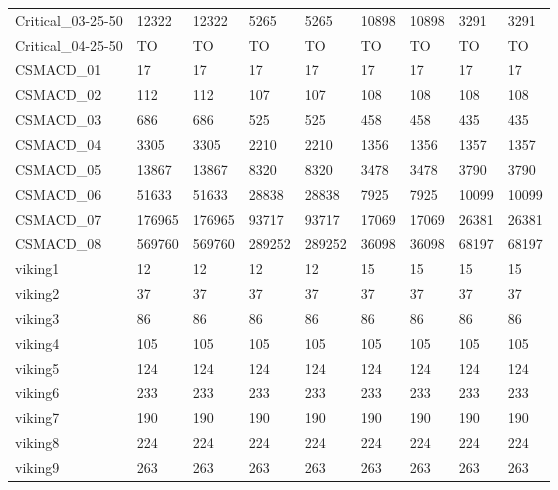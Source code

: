 \begin{table}
\begin{adjustbox}{max totalheight=\textheight}
\begin{tabular}{|l|llllllll|}
    Critical\_03-25-50 & 12322    & 12322    & 5265     & 5265     & 10898 & 10898 & 3291  & 3291  \\
    Critical\_04-25-50 & TO       & TO       & TO       & TO       & TO    & TO    & TO    & TO    \\ \hline
    CSMACD\_01         & 17       & 17       & 17       & 17       & 17    & 17    & 17    & 17    \\
    CSMACD\_02         & 112      & 112      & 107      & 107      & 108   & 108   & 108   & 108   \\
    CSMACD\_03         & 686      & 686      & 525      & 525      & 458   & 458   & 435   & 435   \\
    CSMACD\_04         & 3305     & 3305     & 2210     & 2210     & 1356  & 1356  & 1357  & 1357  \\
    CSMACD\_05         & 13867    & 13867    & 8320     & 8320     & 3478  & 3478  & 3790  & 3790  \\
    CSMACD\_06         & 51633    & 51633    & 28838    & 28838    & 7925  & 7925  & 10099 & 10099 \\
    CSMACD\_07         & 176965   & 176965   & 93717    & 93717    & 17069 & 17069 & 26381 & 26381 \\
    CSMACD\_08         & 569760   & 569760   & 289252   & 289252   & 36098 & 36098 & 68197 & 68197 \\ \hline
    viking1            & 12       & 12       & 12       & 12       & 15    & 15    & 15    & 15    \\
    viking2            & 37       & 37       & 37       & 37       & 37    & 37    & 37    & 37    \\
    viking3            & 86       & 86       & 86       & 86       & 86    & 86    & 86    & 86    \\
    viking4            & 105      & 105      & 105      & 105      & 105   & 105   & 105   & 105   \\
    viking5            & 124      & 124      & 124      & 124      & 124   & 124   & 124   & 124   \\
    viking6            & 233      & 233      & 233      & 233      & 233   & 233   & 233   & 233   \\
    viking7            & 190      & 190      & 190      & 190      & 190   & 190   & 190   & 190   \\
    viking8            & 224      & 224      & 224      & 224      & 224   & 224   & 224   & 224   \\
    viking9            & 263      & 263      & 263      & 263      & 263   & 263   & 263   & 263   \\

\end{tabular}
\end{adjustbox}
\end{table}
